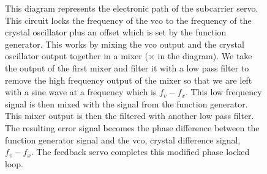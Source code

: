 \begin{figure}
\caption[Subcarrier Servo Electronics]{This diagram represents the
    electronic path of the subcarrier servo. This circuit locks the frequency
    of the vco to the frequency of the crystal oscillator plus an offset
    which is set by the function generator. This works by mixing the vco
    output and the crystal oscillator output together in a mixer ($\times$ in
    the diagram).
    We take the output of the first mixer and filter it with a low pass
    filter to remove the high frequency output of the mixer so that we
    are left with a sine wave at a frequency which is $f_v-f_x$.
    This low frequency signal is then mixed with the signal from the function
    generator.
    This mixer output is then the filtered with another low pass
    filter.
    The resulting error signal becomes the phase difference between the function
    generator signal and the vco, crystal difference signal, $f_v-f_x$.
    The feedback servo completes this modified phase locked loop.
    }
\label{fig:scsfeedback}
\end{figure}

